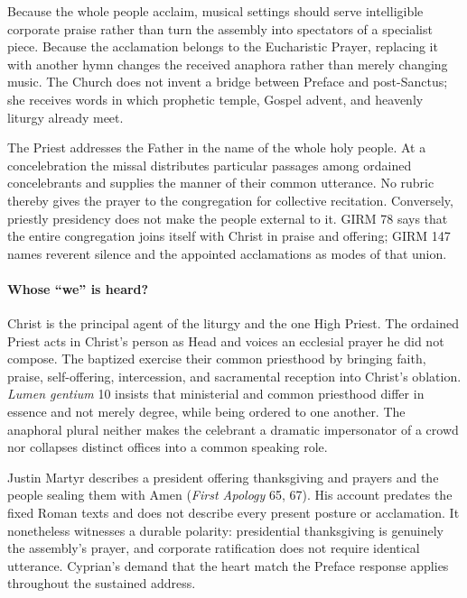 Because the whole people acclaim, musical settings should serve intelligible corporate praise rather than turn the assembly into spectators of a specialist piece. Because the acclamation belongs to the Eucharistic Prayer, replacing it with another hymn changes the received anaphora rather than merely changing music. The Church does not invent a bridge between Preface and post-Sanctus; she receives words in which prophetic temple, Gospel advent, and heavenly liturgy already meet.


The Priest addresses the Father in the name of the whole holy people. At a concelebration the missal distributes particular passages among ordained concelebrants and supplies the manner of their common utterance. No rubric thereby gives the prayer to the congregation for collective recitation. Conversely, priestly presidency does not make the people external to it. GIRM 78 says that the entire congregation joins itself with Christ in praise and offering; GIRM 147 names reverent silence and the appointed acclamations as modes of that union.

\paragraph{Whose ``we'' is heard?}
Christ is the principal agent of the liturgy and the one High Priest. The ordained Priest acts in Christ's person as Head and voices an ecclesial prayer he did not compose. The baptized exercise their common priesthood by bringing faith, praise, self-offering, intercession, and sacramental reception into Christ's oblation. \emph{Lumen gentium} 10 insists that ministerial and common priesthood differ in essence and not merely degree, while being ordered to one another. The anaphoral plural neither makes the celebrant a dramatic impersonator of a crowd nor collapses distinct offices into a common speaking role.

Justin Martyr describes a president offering thanksgiving and prayers and the people sealing them with Amen (\emph{First Apology} 65, 67). His account predates the fixed Roman texts and does not describe every present posture or acclamation. It nonetheless witnesses a durable polarity: presidential thanksgiving is genuinely the assembly's prayer, and corporate ratification does not require identical utterance. Cyprian's demand that the heart match the Preface response applies throughout the sustained address.


